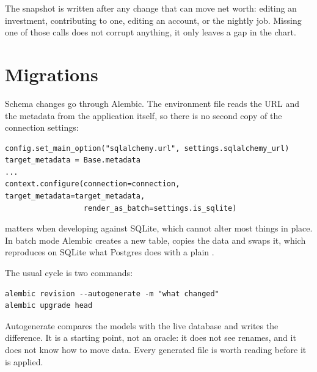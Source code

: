 The snapshot is written after any change that can move net worth: editing an
investment, contributing to one, editing an account, or the nightly job. Missing
one of those calls does not corrupt anything, it only leaves a gap in the chart.

\section{Migrations}

Schema changes go through Alembic. The environment file reads the URL and the
metadata from the application itself, so there is no second copy of the
connection settings:

\begin{lstlisting}[style=py]
config.set_main_option("sqlalchemy.url", settings.sqlalchemy_url)
target_metadata = Base.metadata
...
context.configure(connection=connection, target_metadata=target_metadata,
                  render_as_batch=settings.is_sqlite)
\end{lstlisting}

 matters when developing against SQLite, which cannot
alter most things in place. In batch mode Alembic creates a new table, copies the
data and swaps it, which reproduces on SQLite what Postgres does with a plain
.

The usual cycle is two commands:

\begin{lstlisting}[style=sh]
alembic revision --autogenerate -m "what changed"
alembic upgrade head
\end{lstlisting}

Autogenerate compares the models with the live database and writes the
difference. It is a starting point, not an oracle: it does not see renames, and
it does not know how to move data. Every generated file is worth reading before
it is applied.
